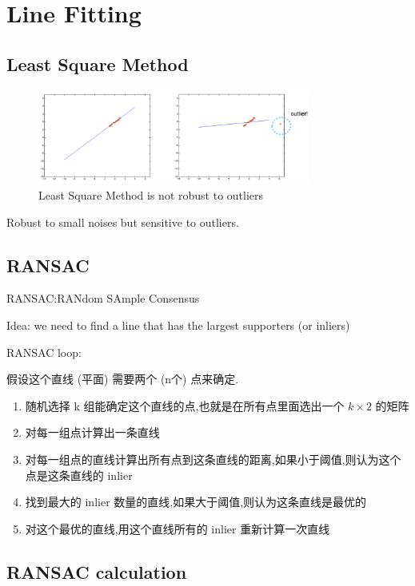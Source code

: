 \chapter{Line Fitting}

\section{Least Square Method}

\begin{figure}[htbp]
    \centering
    \includegraphics[width=0.8\textwidth]{figures/not_roboust_outliner.png}
    \caption{Least Square Method is not robust to outliers}
\end{figure}

Robust to small noises but sensitive to outliers.

\section{RANSAC}

RANSAC:RANdom SAmple Consensus

Idea: we need to ﬁnd a line that has the largest supporters (or inliers)

RANSAC loop:

假设这个直线 (平面) 需要两个 (n个) 点来确定.

\begin{enumerate}
    \item 随机选择 k 组能确定这个直线的点,也就是在所有点里面选出一个 $k\times 2$ 的矩阵
    \item 对每一组点计算出一条直线
    \item 对每一组点的直线计算出所有点到这条直线的距离,如果小于阈值,则认为这个点是这条直线的 inlier
    \item 找到最大的 inlier 数量的直线,如果大于阈值,则认为这条直线是最优的
    \item 对这个最优的直线,用这个直线所有的 inlier 重新计算一次直线
\end{enumerate}

\section{RANSAC calculation}

